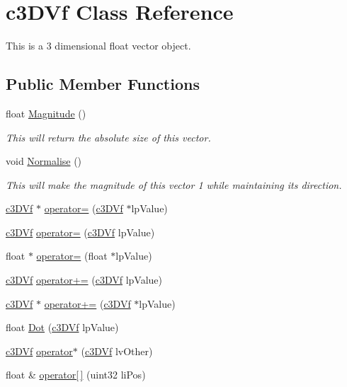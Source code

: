 \hypertarget{classc3_d_vf}{
\section{c3DVf Class Reference}
\label{classc3_d_vf}
}


This is a 3 dimensional float vector object.  


\subsection*{Public Member Functions}
\begin{DoxyCompactItemize}
\item 
float \hyperlink{classc3_d_vf_a51e7f3135f7985012fb4ec32b2a4872c}{Magnitude} ()
\begin{DoxyCompactList}\small\item\em This will return the absolute size of this vector. \item\end{DoxyCompactList}\item 
void \hyperlink{classc3_d_vf_a2e5e5e198b5b5834e307aa29b09d203a}{Normalise} ()
\begin{DoxyCompactList}\small\item\em This will make the magnitude of this vector 1 while maintaining its direction. \item\end{DoxyCompactList}\item 
\hyperlink{classc3_d_vf}{c3DVf} $\ast$ \hyperlink{classc3_d_vf_a56d7db4832cc164663eb09576d202fdf}{operator=} (\hyperlink{classc3_d_vf}{c3DVf} $\ast$lpValue)
\item 
\hyperlink{classc3_d_vf}{c3DVf} \hyperlink{classc3_d_vf_a9572ff4683be4f0b554af14eeb155292}{operator=} (\hyperlink{classc3_d_vf}{c3DVf} lpValue)
\item 
float $\ast$ \hyperlink{classc3_d_vf_a562f0e0b79e37f80e203d107cd501ea1}{operator=} (float $\ast$lpValue)
\item 
\hyperlink{classc3_d_vf}{c3DVf} \hyperlink{classc3_d_vf_aa5088a9c7b056a160c0b4bc1745131fb}{operator+=} (\hyperlink{classc3_d_vf}{c3DVf} lpValue)
\item 
\hyperlink{classc3_d_vf}{c3DVf} $\ast$ \hyperlink{classc3_d_vf_a66663161b99648cf5d171c5f5ade31b1}{operator+=} (\hyperlink{classc3_d_vf}{c3DVf} $\ast$lpValue)
\item 
float \hyperlink{classc3_d_vf_ab129f2b7d7e584a81a8154c79d58ff04}{Dot} (\hyperlink{classc3_d_vf}{c3DVf} lpValue)
\item 
\hyperlink{classc3_d_vf}{c3DVf} \hyperlink{classc3_d_vf_a9dee0b630549ea6e972b0a2e308fdbc8}{operator$\ast$} (\hyperlink{classc3_d_vf}{c3DVf} lvOther)
\item 
float \& \hyperlink{classc3_d_vf_a9c73399eb28acfbe9a132c679249aea0}{operator\mbox{[}$\,$\mbox{]}} (uint32 liPos)
\end{DoxyCompactItemize}
